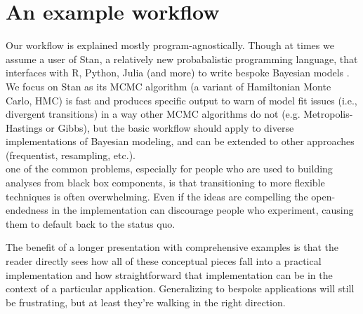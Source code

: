 \documentclass[11pt]{article}
\begin{document}

\section*{An example workflow}

Our workflow is explained mostly program-agnostically. Though at times we assume a user of \textsf{Stan}, a relatively new probabalistic programming language, that interfaces with \textsf{R, Python, Julia} (and more) to write bespoke Bayesian models \citep{Carpenter:2017stan}. We focus on \textsf{Stan} as its MCMC algorithm (a variant of Hamiltonian Monte Carlo, HMC) is fast and produces specific output to warn of model fit issues (i.e., divergent transitions) in a way other MCMC algorithms do not (e.g. Metropolis-Hastings or Gibbs), but the basic workflow should apply to diverse implementations of Bayesian modeling, and can be extended to other approaches (frequentist, resampling, etc.). \\ %

one of the common problems, especially for people who are used to building analyses from black box components, is that transitioning to more flexible techniques is often overwhelming.  Even if the ideas are compelling the open-endedness in the implementation can discourage people who experiment, causing them to default back to the status quo.

The benefit of a longer presentation with comprehensive examples is that the reader directly sees how all of these conceptual pieces fall into a practical implementation and how straightforward that implementation can be in the context of a particular application.  Generalizing to bespoke applications will still be frustrating, but at least they're walking in the right direction.
\end{document}
